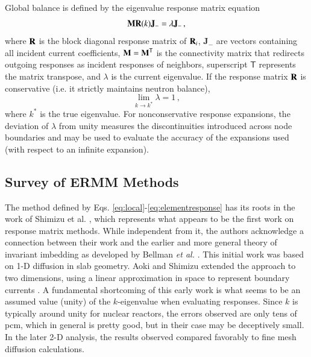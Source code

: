 Global balance is defined by the eigenvalue response matrix
equation
\begin{equation}
  \mathbf{M}\mathbf{R}(k)\mathbf{J_-}  = \lambda \mathbf{J_-} \, ,
  \label{eq:erme}
\end{equation}
where 
$\mathbf{R}$ is the block diagonal response matrix of $\mathbf{R}_i$,  
$\mathbf{J}_{-}$ are vectors containing all incident current coefficients, 
$\mathbf{M}=\mathbf{M}^\mathsf{T}$ is 
the connectivity matrix that redirects outgoing responses as incident
responses of neighbors, superscript $\mathsf{T}$ represents the matrix 
transpose, and $\lambda$ is the current eigenvalue.  
If the response matrix $\mathbf{R}$ is conservative (i.e. it
strictly maintains neutron balance),
\begin{equation}
 \lim_{k\to k^*} \lambda = 1 \, ,
\end{equation}
where $k^*$ is the true eigenvalue.
For nonconservative response expansions, the deviation of $\lambda$ from
unity measures the discontinuities introduced across node boundaries and 
may be used to evaluate the accuracy of the expansions used (with 
respect to an infinite expansion).


\subsection{Survey of ERMM Methods}

The method defined by
Eqs. \ref{eq:local}-\ref{eq:elementresponse} has its roots in
 the work of Shimizu et al.
\cite{shimizu1963rmm, shimizu1963arm}, 
which represents what appears to be the first work on response 
matrix methods.  While independent from it, the authors 
acknowledge a connection between their work and the earlier and 
more general theory of invariant imbedding as developed by 
Bellman {\it et al.} \cite{bellman1960iim}.  This initial work was 
based on 1-D diffusion in slab geometry. 
Aoki and Shimizu extended the approach to two dimensions, 
using a linear approximation in space to represent boundary
currents \cite{aoki1965arm}.
A fundamental shortcoming of this early work is what seems to
be an assumed value (unity) of the $k$-eigenvalue when evaluating responses.
Since $k$ is typically around unity for nuclear reactors, the errors 
observed are only tens of pcm, which in general is pretty good, but in 
their case may be deceptively small.  In the later 2-D analysis, the 
results observed compared favorably to fine mesh diffusion calculations.

